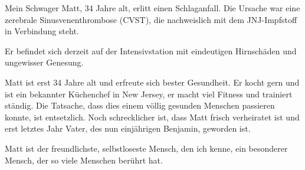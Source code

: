 

Mein Schwager Matt, 34 Jahre alt, erlitt einen Schlaganfall. Die Ursache war eine zerebrale Sinusvenenthrombose (CVST), die nachweislich mit dem JNJ-Impfstoff in Verbindung steht.

Er befindet sich derzeit auf der Intensivstation mit eindeutigen Hirnschäden und ungewisser Genesung.

Matt ist erst 34 Jahre alt und erfreute sich bester Gesundheit. Er kocht gern und ist ein bekannter Küchenchef in New Jersey, er macht viel Fitness und trainiert ständig. Die Tatsache, dass dies einem völlig gesunden Menschen passieren konnte, ist entsetzlich. Noch schrecklicher ist, dass Matt frisch verheiratet ist und erst letztes Jahr Vater, des nun einjährigen Benjamin, geworden ist.

Matt ist der freundlichste, selbstloseste Mensch, den ich kenne, ein besonderer Mensch, der so viele Menschen berührt hat.
